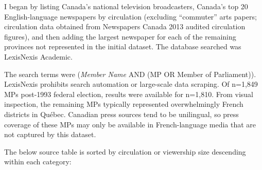 I began by listing Canada's national television broadcasters, Canada's top 20 English-language newspapers by circulation (excluding ``commuter'' arts papers; circulation data obtained from Newspapers Canada 2013 audited circulation figures), and then adding the largest newspaper for each of the remaining provinces not represented in the initial dataset. The database searched was LexisNexis Academic.

The search terms were (\textit{Member Name} AND (MP OR Member of Parliament)). LexisNexis prohibits search automation or large-scale data scraping. Of n=1,849 MPs post-1993 federal election, results were available for n=1,810. From visual inspection, the remaining MPs typically represented overwhelmingly French districts in Qu\'{e}bec. Canadian press sources tend to be unilingual, so press coverage of these MPs may only be available in French-language media that are not captured by this dataset.

The below source table is sorted by circulation or viewership size descending within each category:

